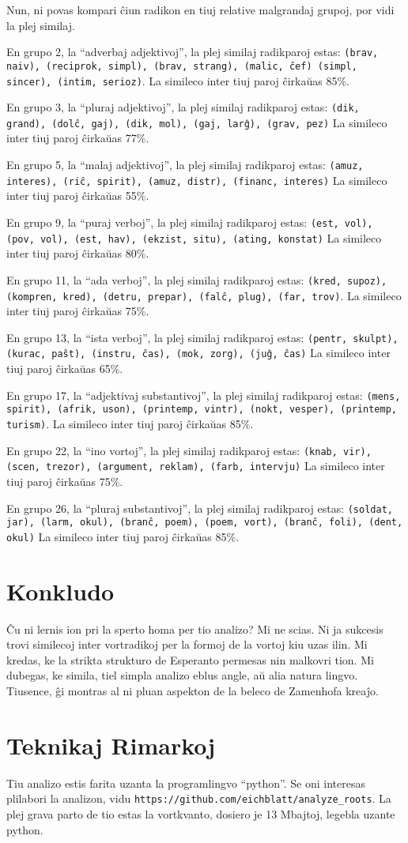 \documentclass[12pt,twoside]{article}
\begin{document}
Nun, ni povas kompari ĉiun radikon en tiuj relative malgrandaj grupoj, por vidi la plej similaj.

En grupo 2, la ``adverbaj adjektivoj'', la plej similaj radikparoj estas: \texttt{(brav, naiv), (reciprok, simpl), (brav, strang), (malic, ĉef)
(simpl, sincer), (intim, serioz)}. La simileco inter tiuj paroj ĉirkaŭas 85\%.

En grupo 3, la ``pluraj adjektivoj'', la plej similaj radikparoj estas: \texttt{(dik, grand), (dolĉ, gaj), (dik, mol), (gaj, larĝ), (grav, pez)}
La simileco inter tiuj paroj ĉirkaŭas 77\%.

En grupo 5, la ``malaj adjektivoj'', la plej similaj radikparoj estas: \texttt{(amuz, interes), (riĉ, spirit), (amuz, distr), (financ, interes)}
La simileco inter tiuj paroj ĉirkaŭas 55\%.

En grupo 9, la ``puraj verboj'', la plej similaj radikparoj estas: \texttt{(est, vol), (pov, vol), (est, hav), (ekzist, situ), (ating, konstat)}
La simileco inter tiuj paroj ĉirkaŭas 80\%.

En grupo 11, la ``ada verboj'', la plej similaj radikparoj estas: \texttt{(kred, supoz), (kompren, kred), (detru, prepar), 
(falĉ, plug), (far, trov)}. La simileco inter tiuj paroj ĉirkaŭas 75\%.

En grupo 13, la ``ista verboj'', la plej similaj radikparoj estas: \texttt{(pentr, skulpt), (kurac, paŝt), (instru, ĉas), (mok, zorg), (juĝ, ĉas)}
La simileco inter tiuj paroj ĉirkaŭas 65\%.

En grupo 17, la ``adjektivaj substantivoj'', la plej similaj radikparoj estas: \texttt{(mens, spirit), (afrik, uson), 
(printemp, vintr), (nokt, vesper), (printemp, turism)}. La simileco inter tiuj paroj ĉirkaŭas 85\%.
 
En grupo 22, la ``ino vortoj'', la plej similaj radikparoj estas: \texttt{(knab, vir), (scen, trezor), (argument, reklam), (farb, intervju)}
La simileco inter tiuj paroj ĉirkaŭas 75\%.

En grupo 26, la ``pluraj substantivoj'', la plej similaj radikparoj estas: \texttt{(soldat, jar), (larm, okul), (branĉ, poem), (poem, vort), (branĉ, foli), (dent, okul)}
La simileco inter tiuj paroj ĉirkaŭas 85\%.

\section{Konkludo}

Ĉu ni lernis ion pri la sperto homa per tio analizo? Mi ne scias. 
Ni ja sukcesis trovi similecoj inter vortradikoj per la formoj de la vortoj kiu uzas ilin. Mi kredas, ke la strikta strukturo de Esperanto permesas
nin malkovri tion. Mi dubegas, ke simila, tiel simpla analizo eblus angle, aŭ alia natura lingvo. 
Tiusence, ĝi montras al ni pluan aspekton de la beleco de Zamenhofa kreaĵo.

\section{Teknikaj Rimarkoj}

Tiu analizo estis farita uzanta la programlingvo ``python''. Se oni interesas plilabori la analizon, vidu \texttt{https://github.com/eichblatt/analyze\_roots}. La plej grava parto de tio estas la vortkvanto, dosiero je 13 Mbajtoj, legebla uzante python.
\end{document}
